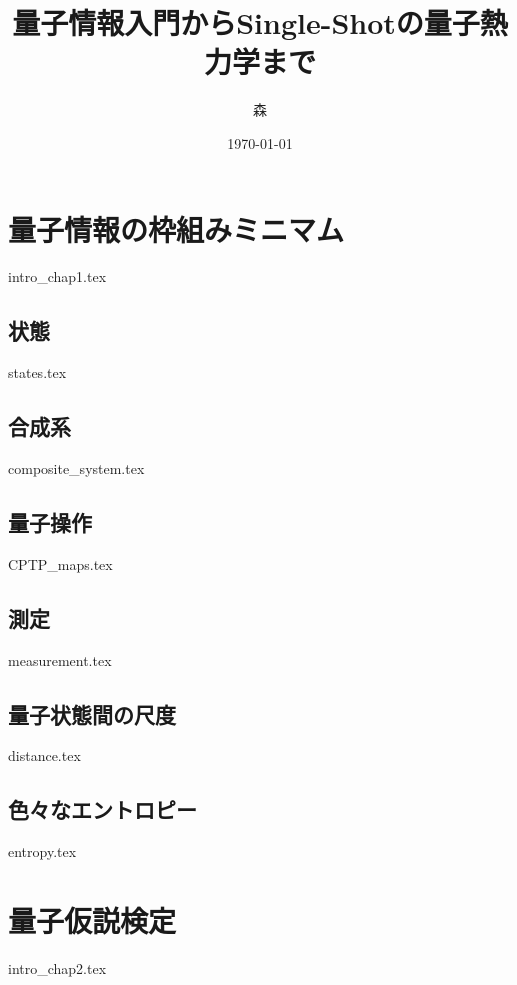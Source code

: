 \documentclass[report]{jlreq}
\title{量子情報入門からSingle-Shotの量子熱力学まで}
\author{森}
\date{\today}
\begin{document}
\maketitle

\setcounter{tocdepth}{1}
\thispagestyle{TOC}
\tableofcontents

\pagestyle{mystyle}

\chapter{量子情報の枠組みミニマム}\label{chap.quantum_info_basic}
{intro_chap1.tex}
\section{状態}
{states.tex}
\section{合成系}
{composite_system.tex}
\section{量子操作}
{CPTP_maps.tex}
\section{測定}
{measurement.tex}
\section{量子状態間の尺度}
{distance.tex}
\section{色々なエントロピー}\label{sec.entropy}
{entropy.tex}

\chapter{量子仮説検定}
{intro_chap2.tex}
\end{document}
